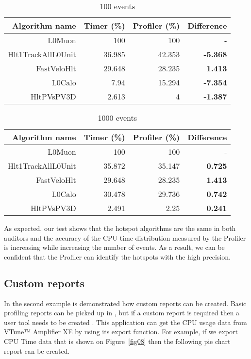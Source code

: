 \begin{table}[H]
\caption{\label{tevents100}100 events}
\begin{center}
\begin{tabular}{rrrr}\toprule
Algorithm name & Timer (\%) & Profiler (\%) & \bf{Difference} \\
\midrule
L0Muon & 100 & 100 & - \\
Hlt1TrackAllL0Unit & 36.985 & 42.353 & \bf{-5.368}\\
FastVeloHlt & 29.648 & 28.235 & \bf{1.413}\\
L0Calo & 7.94 & 15.294 & \bf{-7.354}\\
HltPVsPV3D & 2.613 & 4 & \bf{-1.387}\\
\bottomrule
\end{tabular}
\end{center}
\end{table}

\begin{table}[H]
\caption{\label{tevents1000}1000 events}
\begin{center}
\begin{tabular}{rrrr}\toprule
Algorithm name & Timer (\%) & Profiler (\%) & \bf{Difference} \\
\midrule
L0Muon & 100 & 100 & -\\
Hlt1TrackAllL0Unit & 35.872 & 35.147 & \bf{0.725}\\
FastVeloHlt & 29.648 & 28.235 & \bf{1.413}\\
L0Calo & 30.478 & 29.736 & \bf{0.742}\\
HltPVsPV3D & 2.491 & 2.25 & \bf{0.241}\\
\bottomrule
\end{tabular}
\end{center}
\end{table}

As expected, our test shows that the hotspot algorithms are the same in both
auditors and the accuracy of the CPU time distribution measured by the Profiler
is increasing while increasing the number of events. As a result, we can be
confident that the Profiler can identify the hotspots with the high precision.

\subsection{Custom reports}

In the second example is demonstrated how custom reports can be created. Basic
profiling reports can be picked up in
\amp, but if a custom report is required then a user tool needs to be created .
This application can get the CPU usage data from VTune™ Amplifier XE by using
its export function. For example, if we export CPU Time data that is shown on
Figure~\ref{fig08} then the following pie chart report can be created.

